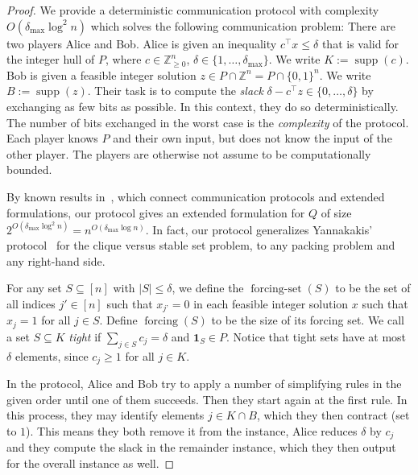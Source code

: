 \documentclass[11pt]{article}
\newcommand{\Z}{\mathbb{Z}}
\DeclareMathOperator{\supp}{supp}
\DeclareMathOperator{\forcing}{forcing}
\DeclareMathOperator{\forcingset}{forcing-set}
\newcommand{\rhs}{\delta}
\theoremstyle{remark}
\begin{document}
\begin{proof}
We provide a deterministic communication protocol with complexity $O(\rhs_{\max} \log^2 n)$ which solves the following communication problem:
There are two players Alice and Bob. Alice is given an inequality $c^\intercal x \le \rhs$ that is valid for the integer hull of $P$, where $c \in \Z^n_{\ge 0}$, $\rhs \in \{1,\ldots,\rhs_{\max}\}$. We write $K:=\supp(c)$. Bob is given a feasible integer solution $z \in P \cap \Z^n = P \cap \{0,1\}^n$. We write $B:=\supp(z)$. Their task is to compute the \emph{slack} $\rhs - c^\intercal z \in \{0,\ldots,\rhs\}$ by exchanging as few bits as possible. In this context, they do so deterministically. The number of bits exchanged in the worst case is the \emph{complexity} of the protocol. Each player knows $P$ and their own input, but does not know the input of the other player. The players are otherwise not assume to be computationally bounded.

By known results in~\cite{yan88}, which connect communication protocols and extended formulations, our protocol gives an extended formulation for $Q$ of size $2^{O(\rhs_{\max} \log^2 n)} = n^{O(\rhs_{\max} \log n)}$. In fact, our protocol generalizes Yannakakis' protocol~\cite{yan88} for the clique versus stable set problem, to any packing problem and any right-hand side.

For any set $S \subseteq [n]$ with $|S| \le \rhs$, we define the $\forcingset(S)$ to be the set of all indices $j' \in [n]$ such that $x_{j’} = 0$ in each feasible integer solution $x$ such that $x_j = 1$ for all $j \in S$. 
Define $\forcing(S)$ to be the size of its forcing set. We call a set $S \subseteq K$ \emph{tight} if $\sum_{j \in S} c_j = \rhs$ and $\mathbf 1_S \in P$. Notice that tight sets have at most $\rhs$ elements, since $c_j \ge 1$ for all $j\in K$.

In the protocol, Alice and Bob try to apply a number of simplifying rules in the given order until one of them succeeds. Then
they start again at the first rule.
In this process, they may identify elements $j\in K\cap B$, which they then contract (set to $1$).
This means they both remove it from the instance, Alice reduces $\rhs$ by $c_j$ and they compute the slack in
the remainder instance, which they then output for the overall instance as well.


\end{proof}
\end{document}
